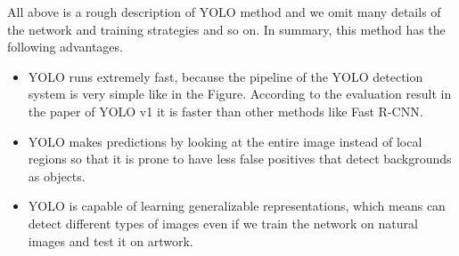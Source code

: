 \documentclass[runningheads]{llncs}
\begin{document}
All above is a rough description of YOLO method and we omit many details of the network and training strategies and so on. In summary, this method has the following advantages.

\begin{itemize}
	\item YOLO runs extremely fast, because the pipeline of the YOLO detection system is very simple like in the Figure. According to the evaluation result in the paper of YOLO v1 it is faster than other methods like Fast R-CNN.
	\item YOLO makes predictions by looking at the entire image instead of local regions so that it is prone to have less false positives that detect backgrounds as objects.
	\item YOLO is capable of learning generalizable representations, which means can detect different types of images even if we train the network on natural images and test it on artwork.
\end{itemize}
\end{document}
